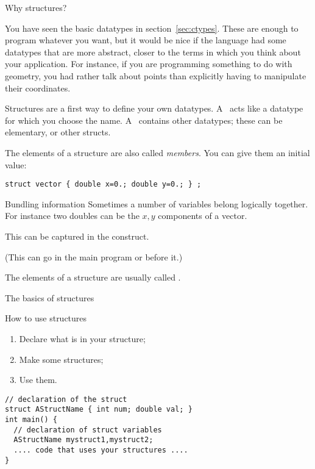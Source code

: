 
 {Why structures?}
\label{sec:struct}

You have seen the basic datatypes in section~\ref{sec:ctypes}. These
are enough to program whatever you want, but it would be nice if the
language had some datatypes that are more abstract, closer to the
terms in which you think about your application. For instance, if you
are programming something to do with geometry, you had rather talk
about points than explicitly having to manipulate their coordinates.

Structures are a
first way to define your own datatypes. A~
acts like a datatype for which you choose the name. A~
contains other datatypes; these can be elementary, or other structs.
%

The elements of a structure are also called
\emph{members}.
You can give them an initial value:
\begin{verbatim}
struct vector { double x=0.; double y=0.; } ;
\end{verbatim}
  
\begin{slide}{Bundling information}
  \label{sl:struct-why}
  Sometimes a number of variables belong logically together. For
  instance two doubles can be the $x,y$ components of a vector.

  This can be captured in the  construct.


  (This can go in the main program or before it.)

The elements of a structure are usually called .
\end{slide}

 {The basics of structures}

\begin{block}{How to use structures}
  \label{sl:structinprog}
  \begin{enumerate}
  \item Declare what is in your structure;
  \item Make some structures;
  \item Use them.
  \end{enumerate}
\begin{verbatim}
// declaration of the struct
struct AStructName { int num; double val; }
int main() {
  // declaration of struct variables
  AStructName mystruct1,mystruct2;
  .... code that uses your structures ....
}
\end{verbatim}
\end{block}

